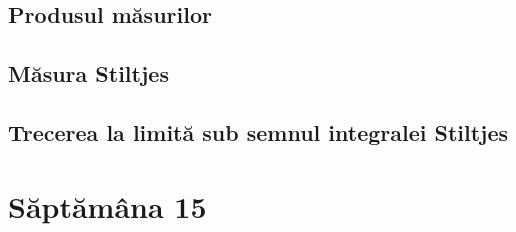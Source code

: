 \documentclass[a4paper,12pt]{article}
\theoremstyle{change}
\begin{document}

\subsection{Produsul măsurilor}


\subsection{Măsura Stiltjes}


\subsection{Trecerea la limită sub semnul integralei Stiltjes}

\section{Săptămâna 15}
\end{document}
